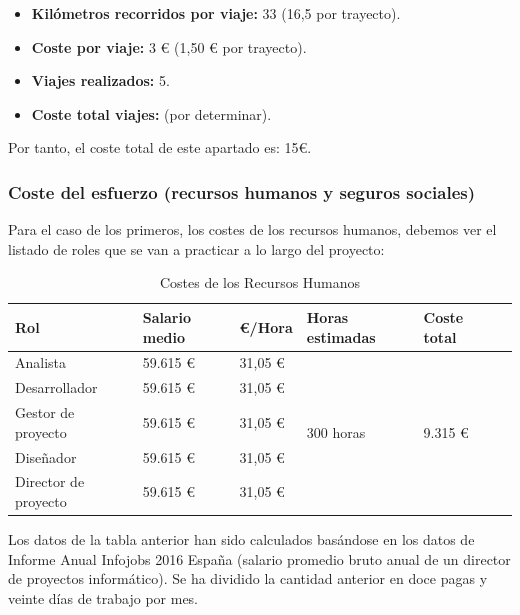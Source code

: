 \documentclass[twoside]{report}
\begin{document}
\begin{itemize}
\item \textbf{Kilómetros recorridos por viaje:} 33 (16,5 por trayecto).
\item \textbf{Coste por viaje:} 3 \euro \hspace{0.1cm} (1,50 \euro \hspace{0.1cm} por trayecto).
\item \textbf{Viajes realizados:} 5.
\item \textbf{Coste total viajes:} (por determinar).
\end{itemize}

Por tanto, el coste total de este apartado es: 15\euro.

\subsubsection{Coste del esfuerzo (recursos humanos y seguros sociales)}

Para el caso de los primeros, los costes de los recursos humanos, debemos ver el listado de roles que se van a practicar a lo largo del proyecto:

\begin{table}[H]
\center
\begin{tabular}{|l|l|l|l|l|l|}
\hline
Rol                & Salario medio & \euro/Hora   & Horas estimadas & Coste total \\ \hline
Analista           & 59.615 \euro      & 31,05 \euro & \multirow{5}{*}{300 horas} & \multirow{5}{*}{9.315 \euro} \\\cline{1-3}
Desarrollador      & 59.615 \euro      & 31,05 \euro  & & \\\cline{1-3}
Gestor de proyecto & 59.615 \euro      & 31,05 \euro & & \\ \cline{1-3}
Diseñador          & 59.615 \euro      & 31,05 \euro & & \\ \cline{1-3}
Director de proyecto & 59.615 \euro    & 31,05 \euro & & \\ \cline{1-3}
\hline
\end{tabular}
\caption{Costes de los Recursos Humanos}
\end{table}

Los datos de la tabla anterior han sido calculados basándose en los datos de \cite{infojobs2016} Informe Anual Infojobs 2016 España (salario promedio bruto anual de un director de proyectos informático). Se ha dividido la cantidad anterior en doce pagas y veinte días de trabajo por mes.
\end{document}
